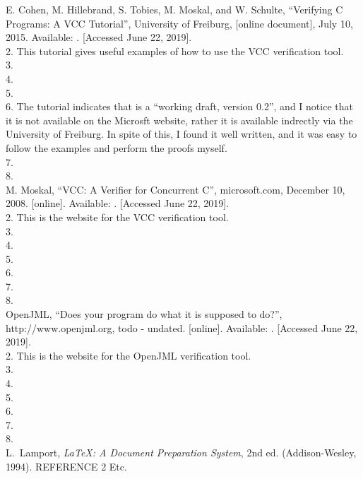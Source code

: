 \documentclass[12pt,openany,a4paper]{book}
\begin{document}
\begin{thebibliography}{99}
 E. Cohen, M. Hillebrand, S. Tobies, M. Moskal, and W. Schulte, ``Verifying C Programs: A VCC Tutorial'', University of Freiburg, [online document], July 10, 2015. Available: \href{https://swt.informatik.uni-freiburg.de/teaching/SS2015/swtvl/Resources/literature/vcc-tutorial-col2.pdf}{}. [Accessed June 22, 2019]. \\
2. This tutorial gives useful examples of how to use the VCC verification tool.\\
3. \\
4. \\
5.  \\
6. The tutorial indicates that is a ``working draft, version 0.2'', and I notice that it is not available on the Microsft website, rather it is available indrectly via the University of Freiburg. In spite of this, I found it well written, and it was easy to follow the examples and perform the proofs myself.\\
7. \\
8. \\

 M. Moskal, ``VCC: A Verifier for Concurrent C'', microsoft.com, December 10, 2008. [online]. Available: \href{https://www.microsoft.com/en-us/research/project/vcc-a-verifier-for-concurrent-c/}{}. [Accessed June 22, 2019]. \\
2. This is the website for the VCC verification tool.\\
3. \\
4. \\
5. \\
6. \\
7. \\
8. \\

 OpenJML, ``Does your program do what it is supposed to do?'', http://www.openjml.org, todo - undated. [online]. Available: \href{http://www.openjml.org/}{}. [Accessed June 22, 2019]. \\
2. This is the website for the OpenJML verification tool.\\
3. \\
4. \\
5. \\
6. \\
7. \\
8. \\


 L.~Lamport, \emph{\LaTeX: A Document Preparation
System}, 2nd ed. (Addison-Wesley, 1994).
 REFERENCE 2
 Etc.
\end{thebibliography}
\end{document}
